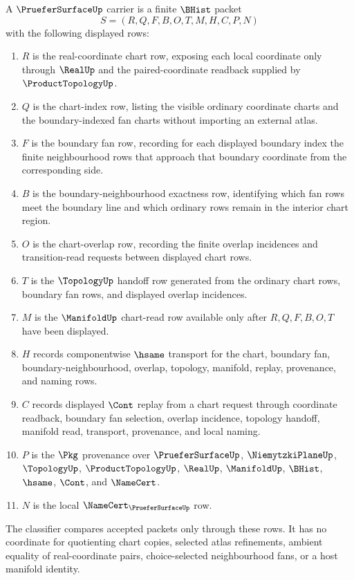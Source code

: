 \begin{definition}
\label{def:pruefer-surface-carrier}
A $\PrueferSurfaceUp$ carrier is a finite $\BHist$ packet
$$
S=(R,Q,F,B,O,T,M,H,C,P,N)
$$
with the following displayed rows:
\begin{enumerate}
\item $R$ is the real-coordinate chart row, exposing each local coordinate only through $\RealUp$ and the paired-coordinate readback supplied by $\ProductTopologyUp$.
\item $Q$ is the chart-index row, listing the visible ordinary coordinate charts and the boundary-indexed fan charts without importing an external atlas.
\item $F$ is the boundary fan row, recording for each displayed boundary index the finite neighbourhood rows that approach that boundary coordinate from the corresponding side.
\item $B$ is the boundary-neighbourhood exactness row, identifying which fan rows meet the boundary line and which ordinary rows remain in the interior chart region.
\item $O$ is the chart-overlap row, recording the finite overlap incidences and transition-read requests between displayed chart rows.
\item $T$ is the $\TopologyUp$ handoff row generated from the ordinary chart rows, boundary fan rows, and displayed overlap incidences.
\item $M$ is the $\ManifoldUp$ chart-read row available only after $R,Q,F,B,O,T$ have been displayed.
\item $H$ records componentwise $\hsame$ transport for the chart, boundary fan, boundary-neighbourhood, overlap, topology, manifold, replay, provenance, and naming rows.
\item $C$ records displayed $\Cont$ replay from a chart request through coordinate readback, boundary fan selection, overlap incidence, topology handoff, manifold read, transport, provenance, and local naming.
\item $P$ is the $\Pkg$ provenance over $\PrueferSurfaceUp$, $\NiemytzkiPlaneUp$, $\TopologyUp$, $\ProductTopologyUp$, $\RealUp$, $\ManifoldUp$, $\BHist$, $\hsame$, $\Cont$, and $\NameCert$.
\item $N$ is the local $\NameCert_{\PrueferSurfaceUp}$ row.
\end{enumerate}
The classifier compares accepted packets only through these rows. It has no coordinate for quotienting chart copies, selected atlas refinements, ambient equality of real-coordinate pairs, choice-selected neighbourhood fans, or a host manifold identity.
\end{definition}

